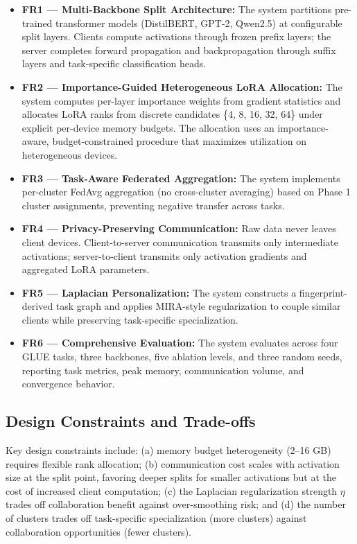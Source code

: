 \documentclass[11pt,a4paper]{article}
\begin{document}
\begin{itemize}
\item \textbf{FR1 --- Multi-Backbone Split Architecture:} The system partitions pre-trained transformer models (DistilBERT, GPT-2, Qwen2.5) at configurable split layers. Clients compute activations through frozen prefix layers; the server completes forward propagation and backpropagation through suffix layers and task-specific classification heads.
\item \textbf{FR2 --- Importance-Guided Heterogeneous LoRA Allocation:} The system computes per-layer importance weights from gradient statistics and allocates LoRA ranks from discrete candidates \{4, 8, 16, 32, 64\} under explicit per-device memory budgets. The allocation uses an importance-aware, budget-constrained procedure that maximizes utilization on heterogeneous devices.
\item \textbf{FR3 --- Task-Aware Federated Aggregation:} The system implements per-cluster FedAvg aggregation (no cross-cluster averaging) based on Phase 1 cluster assignments, preventing negative transfer across tasks.
\item \textbf{FR4 --- Privacy-Preserving Communication:} Raw data never leaves client devices. Client-to-server communication transmits only intermediate activations; server-to-client transmits only activation gradients and aggregated LoRA parameters.
\item \textbf{FR5 --- Laplacian Personalization:} The system constructs a fingerprint-derived task graph and applies MIRA-style regularization to couple similar clients while preserving task-specific specialization.
\item \textbf{FR6 --- Comprehensive Evaluation:} The system evaluates across four GLUE tasks, three backbones, five ablation levels, and three random seeds, reporting task metrics, peak memory, communication volume, and convergence behavior.
\end{itemize}

\subsection{Design Constraints and Trade-offs}

Key design constraints include: (a) memory budget heterogeneity (2--16 GB) requires flexible rank allocation; (b) communication cost scales with activation size at the split point, favoring deeper splits for smaller activations but at the cost of increased client computation; (c) the Laplacian regularization strength $\eta$ trades off collaboration benefit against over-smoothing risk; and (d) the number of clusters trades off task-specific specialization (more clusters) against collaboration opportunities (fewer clusters).
\end{document}
